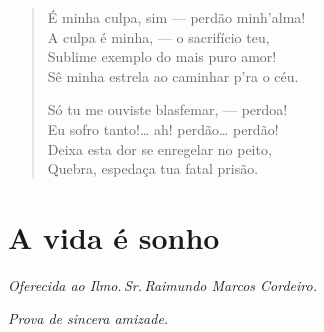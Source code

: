 \begin{verse}
É minha culpa, sim --- perdão minh'alma!\\
A culpa é minha, --- o sacrifício teu,\\
Sublime exemplo do mais puro amor!\\
Sê minha estrela ao caminhar p'ra o céu.

Só tu me ouviste blasfemar, --- perdoa!\\
Eu sofro tanto!\ldots{} ah! perdão\ldots{} perdão!\\
Deixa esta dor se enregelar no peito,\\
Quebra, espedaça tua fatal prisão.
\end{verse}

\chapter{A vida é sonho}

\hfill{}\emph{Oferecida ao Ilmo.\,Sr.\,Raimundo Marcos Cordeiro.}

\hfill{}\emph{Prova de sincera amizade.}

